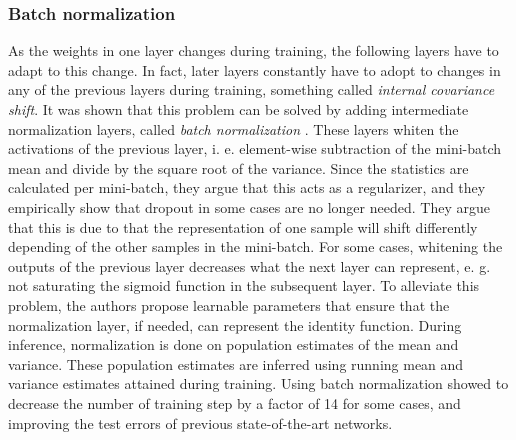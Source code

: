 \subsubsection{Batch normalization}

As the weights in one layer changes during training, the following layers have
to adapt to this change. In fact, later layers constantly have to adopt to
changes in any of the previous layers during training, something called
\textit{internal covariance shift}. It was shown that this problem can be
solved by adding intermediate normalization layers, called \textit{batch
normalization} \cite{ioffe2015batch}. These layers whiten the activations of
the previous layer, i. e. element-wise subtraction of the mini-batch mean and
divide by the square root of the variance. Since the statistics are calculated
per mini-batch, they argue that this acts as a regularizer, and they
empirically show that dropout in some cases are no longer needed. They argue
that this is due to that the representation of one sample will shift
differently depending of the other samples in the mini-batch. For some cases,
whitening the outputs of the previous layer decreases what the next layer can
represent, e. g. not saturating the sigmoid function in the subsequent layer.
To alleviate this problem, the authors propose learnable parameters that ensure
that the normalization layer, if needed, can represent the identity function.
During inference, normalization is done on population estimates of the mean and
variance. These population estimates are inferred using running mean and
variance estimates attained during training. Using batch normalization showed
to decrease the number of training step by a factor of 14 for some cases, and
improving the test errors of previous state-of-the-art networks.

%
%
%
%
